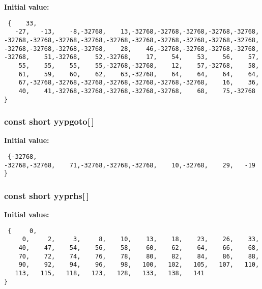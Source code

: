 {\bf Initial value:}

\footnotesize\begin{verbatim} {    33,
   -27,   -13,    -8,-32768,    13,-32768,-32768,-32768,-32768,-32768,
-32768,-32768,-32768,-32768,-32768,-32768,-32768,-32768,-32768,-32768,
-32768,-32768,-32768,-32768,    28,    46,-32768,-32768,-32768,-32768,
-32768,    51,-32768,    52,-32768,    17,    54,    53,    56,    57,
    55,    55,    55,    55,-32768,-32768,    12,    57,-32768,    58,
    61,    59,    60,    62,    63,-32768,    64,    64,    64,    64,
    67,-32768,-32768,-32768,-32768,-32768,-32768,-32768,    16,    36,
    40,    41,-32768,-32768,-32768,-32768,-32768,    68,    75,-32768
}\end{verbatim}\normalsize 
{}
\subsubsection{\setlength{\rightskip}{0pt plus 5cm}const short yypgoto[$\,$]\hspace{0.3cm}{\tt  [static]}}\label{vcd__parser_8c_a94}


{\bf Initial value:}

\footnotesize\begin{verbatim} {-32768,
-32768,-32768,    71,-32768,-32768,-32768,    10,-32768,    29,   -19
}\end{verbatim}\normalsize 
{}
\subsubsection{\setlength{\rightskip}{0pt plus 5cm}const short yyprhs[$\,$]\hspace{0.3cm}{\tt  [static]}}\label{vcd__parser_8c_a85}


{\bf Initial value:}

\footnotesize\begin{verbatim} {     0,
     0,     2,     3,     8,    10,    13,    18,    23,    26,    33,
    40,    47,    54,    56,    58,    60,    62,    64,    66,    68,
    70,    72,    74,    76,    78,    80,    82,    84,    86,    88,
    90,    92,    94,    96,    98,   100,   102,   105,   107,   110,
   113,   115,   118,   123,   128,   133,   138,   141
}\end{verbatim}\normalsize 
{}
